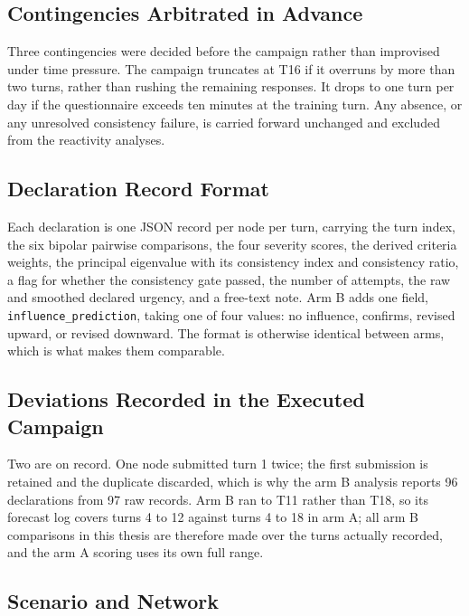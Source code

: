 \subsection*{Contingencies Arbitrated in Advance}

Three contingencies were decided before the campaign rather than improvised under time
pressure. The campaign truncates at T16 if it overruns by more than two turns, rather than
rushing the remaining responses. It drops to one turn per day if the questionnaire exceeds
ten minutes at the training turn. Any absence, or any unresolved consistency failure, is
carried forward unchanged and excluded from the reactivity analyses.

\subsection*{Declaration Record Format}

Each declaration is one JSON record per node per turn, carrying the turn index, the six
bipolar pairwise comparisons, the four severity scores, the derived criteria weights, the
principal eigenvalue with its consistency index and consistency ratio, a flag for whether the
consistency gate passed, the number of attempts, the raw and smoothed declared urgency, and a
free-text note. Arm B adds one field, \texttt{influence\_prediction}, taking one of four
values: no influence, confirms, revised upward, or revised downward. The format is otherwise
identical between arms, which is what makes them comparable.

\subsection*{Deviations Recorded in the Executed Campaign}

Two are on record. One node submitted turn 1 twice; the first submission is retained and the
duplicate discarded, which is why the arm B analysis reports 96 declarations from 97 raw
records. Arm B ran to T11 rather than T18, so its forecast log covers turns 4 to 12 against
turns 4 to 18 in arm A; all arm B comparisons in this thesis are therefore made over the
turns actually recorded, and the arm A scoring uses its own full range.


\subsection{Scenario and Network}
\label{app:scenario_detail}

